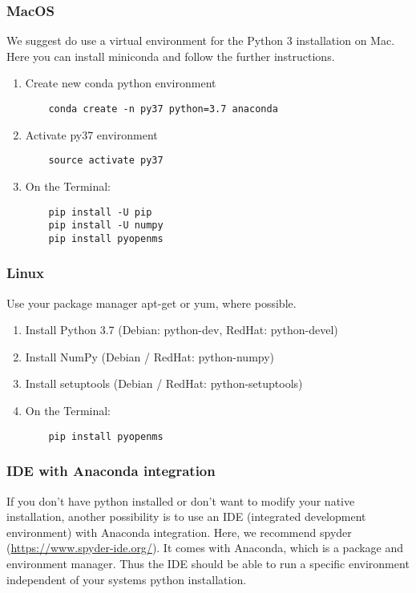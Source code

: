 {\subsubsection{MacOS}
We suggest do use a virtual environment for the Python 3 installation on Mac. 
Here you can install miniconda and follow the further instructions. \\

\begin{enumerate}
  \item Create new conda python environment
    \begin{lstlisting}
    conda create -n py37 python=3.7 anaconda
    \end{lstlisting} 
    \item Activate py37 environment
    \begin{lstlisting}
    source activate py37
    \end{lstlisting} 
  \item On the Terminal:
    \begin{lstlisting}
    pip install -U pip
    pip install -U numpy
    pip install pyopenms
    \end{lstlisting}
\end{enumerate}

\subsubsection{Linux}
Use your package manager apt-get or yum, where possible.
\begin{enumerate}
  \item Install Python 3.7 (Debian: python-dev, RedHat: python-devel)
  \item Install NumPy (Debian / RedHat: python-numpy)
  \item Install setuptools (Debian / RedHat: python-setuptools)
  \item On the Terminal:
    \begin{lstlisting}
    pip install pyopenms
    \end{lstlisting}
\end{enumerate}

\subsubsection{IDE with Anaconda integration}
If you don't have python installed or don't want to modify your native installation, another possibility is to use an IDE (integrated development environment) with Anaconda integration. Here, we recommend spyder (\url{https://www.spyder-ide.org/}). It comes with Anaconda, which is a package and environment manager. Thus the IDE should be able to run a specific environment independent of your systems python installation. \\

}
